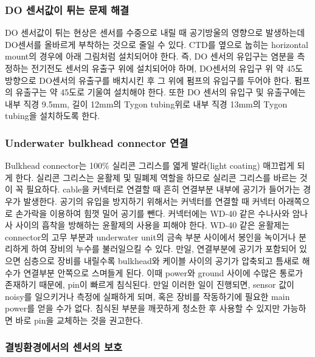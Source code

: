 \documentclass[
]{book}
\begin{document}
\hypertarget{do-uxc13cuxc11cuxac12uxc774-uxd280uxb294-uxbb38uxc81c-uxd574uxacb0}{%
\subsubsection{DO 센서값이 튀는 문제 해결}\label{do-uxc13cuxc11cuxac12uxc774-uxd280uxb294-uxbb38uxc81c-uxd574uxacb0}}

DO 센서값이 튀는 현상은 센서를 수중으로 내릴 때 공기방울의 영향으로 발생하는데 DO센서를 올바르게 부착하는 것으로 줄일 수 있다. CTD를 옆으로 눕히는 horizontal mount의 경우에 아래 그림처럼 설치되어야 한다. 즉, DO 센서의 유입구는 염분을 측정하는 전기전도 센서의 유출구 위에 설치되어야 하며, DO센서의 유입구 위 약 45도 방향으로 DO센서의 유출구를 배치시킨 후 그 위에 펌프의 유입구를 두어야 한다. 펌프의 유출구는 약 45도로 기울여 설치해야 한다. 또한 DO 센서의 유입구 및 유출구에는 내부 직경 9.5mm, 길이 12mm의 Tygon tubing위로 내부 직경 13mm의 Tygon tubing을 설치하도록 한다.

\hypertarget{underwater-bulkhead-connector-uxc5f0uxacb0}{%
\subsubsection{Underwater bulkhead connector 연결}\label{underwater-bulkhead-connector-uxc5f0uxacb0}}

Bulkhead connector는 100\% 실리콘 그리스를 엷게 발라(light coating) 매끄럽게 되게 한다. 실리콘 그리스는 윤활제 및 밀폐제 역할을 하므로 실리콘 그리스를 바르는 것이 꼭 필요하다. cable을 커넥터로 연결할 때 흔히 연결부분 내부에 공기가 들어가는 경우가 발생한다. 공기의 유입을 방지하기 위해서는 커넥터를 연결할 때 커넥터 아래쪽으로 손가락을 이용하여 힘껏 밀어 공기를 뺀다. 커넥터에는 WD-40 같은 수나사와 암나사 사이의 흡착을 방해하는 윤활제의 사용을 피해야 한다. WD-40 같은 윤활제는 connector의 고무 부분과 underwater unit의 금속 부분 사이에서 봉인을 녹이거나 분리하게 하여 장비의 누수를 불러일으킬 수 있다.
만일, 연결부분에 공기가 포함되어 있으면 심층으로 장비를 내릴수록 bulkhead와 케이블 사이의 공기가 압축되고 틈새로 해수가 연결부분 안쪽으로 스며들게 된다. 이때 power와 ground 사이에 수많은 통로가 존재하기 때문에, pin이 빠르게 침식된다. 만일 이러한 일이 진행되면, sensor 값이 noisy를 일으키거나 측정에 실패하게 되며, 혹은 장비를 작동하기에 필요한 main power를 얻을 수가 없다. 침식된 부분을 깨끗하게 청소한 후 사용할 수 있지만 가능하면 바로 pin을 교체하는 것을 권고한다.

\hypertarget{uxacb0uxbe59uxd658uxacbduxc5d0uxc11cuxc758-uxc13cuxc11cuxc758-uxbcf4uxd638}{%
\subsubsection{결빙환경에서의 센서의 보호}\label{uxacb0uxbe59uxd658uxacbduxc5d0uxc11cuxc758-uxc13cuxc11cuxc758-uxbcf4uxd638}}
\end{document}

